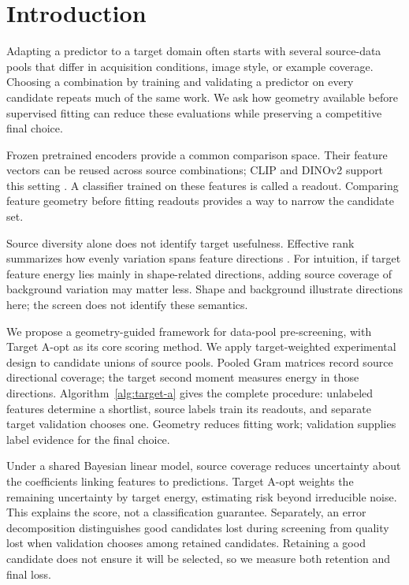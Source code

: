 \section{Introduction}
Adapting a predictor to a target domain often starts with several source-data pools that differ in acquisition conditions, image style, or example coverage. Choosing a combination by training and validating a predictor on every candidate repeats much of the same work. We ask how geometry available before supervised fitting can reduce these evaluations while preserving a competitive final choice.

Frozen pretrained encoders provide a common comparison space. Their feature vectors can be reused across source combinations; CLIP and DINOv2 support this setting \citep{radford2021,oquab2024}. A classifier trained on these features is called a readout. Comparing feature geometry before fitting readouts provides a way to narrow the candidate set.

Source diversity alone does not identify target usefulness. Effective rank summarizes how evenly variation spans feature directions \citep{roy2007,garrido2023rankme}. For intuition, if target feature energy lies mainly in shape-related directions, adding source coverage of background variation may matter less. Shape and background illustrate directions here; the screen does not identify these semantics.

We propose a geometry-guided framework for data-pool pre-screening, with Target A-opt as its core scoring method. We apply target-weighted experimental design \citep{yu2006,hubotter2024transductive} to candidate unions of source pools. Pooled Gram matrices record source directional coverage; the target second moment measures energy in those directions. Algorithm~\ref{alg:target-a} gives the complete procedure: unlabeled features determine a shortlist, source labels train its readouts, and separate target validation chooses one. Geometry reduces fitting work; validation supplies label evidence for the final choice.

Under a shared Bayesian linear model, source coverage reduces uncertainty about the coefficients linking features to predictions. Target A-opt weights the remaining uncertainty by target energy, estimating risk beyond irreducible noise. This explains the score, not a classification guarantee. Separately, an error decomposition distinguishes good candidates lost during screening from quality lost when validation chooses among retained candidates. Retaining a good candidate does not ensure it will be selected, so we measure both retention and final loss.

